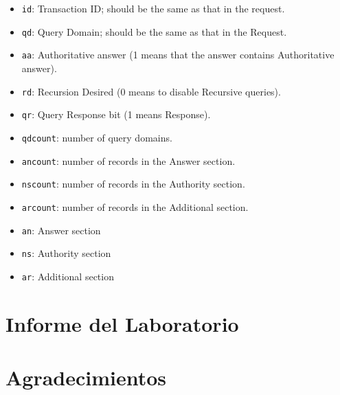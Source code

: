  
\begin{itemize}[noitemsep]
\item \texttt{id}: Transaction ID; should be the same as that in the request.
\item \texttt{qd}: Query Domain; should be the same as that in the Request.
\item \texttt{aa}: Authoritative answer (1 means that the answer contains Authoritative answer).
\item \texttt{rd}: Recursion Desired (0 means to disable Recursive queries).
\item \texttt{qr}: Query Response bit (1 means Response).
\item \texttt{qdcount}: number of query domains. 
\item \texttt{ancount}: number of records in the Answer section.
\item \texttt{nscount}: number of records in the Authority section. 
\item \texttt{arcount}: number of records in the Additional section. 
\item \texttt{an}: Answer section 
\item \texttt{ns}: Authority section
\item \texttt{ar}: Additional section
\end{itemize}
  



\section{Informe del Laboratorio}




\section*{Agradecimientos}





